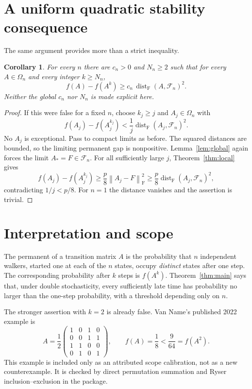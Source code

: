 \documentclass[11pt]{article}
\newtheorem{corollary}[theorem]{Corollary}
\theoremstyle{remark}\newtheorem{remark}[theorem]{Remark}
\DeclareMathOperator{\dist}{dist}
\newcommand{\Om}{\Omega_n}
\newcommand{\Fset}{\mathcal F_n}
\newcommand{\fn}[1]{\left\|#1\right\|_{\mathrm F}}
\begin{document}
\section{A uniform quadratic stability consequence}
The same argument provides more than a strict inequality.
\begin{corollary}\label{cor:stability}
For every $n$ there are $c_n>0$ and $N_n\ge2$ such that for every
$A\in\Om$ and every integer $k\ge N_n$,
\begin{equation}\label{eq:globalstability}
 f(A)-f(A^k)\ge c_n\,\dist_{\mathrm F}(A,\Fset)^2.
\end{equation}
Neither the global $c_n$ nor $N_n$ is made explicit here.
\end{corollary}
\begin{proof}
If this were false for a fixed $n$, choose $k_j\ge j$ and $A_j\in\Om$
with
\[
 f(A_j)-f(A_j^{k_j})<\frac1j\dist_{\mathrm F}(A_j,\Fset)^2.
\]
No $A_j$ is exceptional. Pass to compact limits as before. The squared
distances are bounded, so the limiting permanent gap is nonpositive.
Lemma~\ref{lem:global} again forces the limit $A_*=F\in\Fset$.
For all sufficiently large $j$, Theorem~\ref{thm:local} gives
\[
 f(A_j)-f(A_j^{k_j})
 \ge\frac p8\fn{A_j-F}^2
 \ge\frac p8\dist_{\mathrm F}(A_j,\Fset)^2,
\]
contradicting $1/j<p/8$. For $n=1$ the distance vanishes and the
assertion is trivial.
\end{proof}

\section{Interpretation and scope}
The permanent of a transition matrix $A$ is the probability that $n$
independent walkers, started one at each of the $n$ states, occupy
\emph{distinct} states after one step. The corresponding probability
after $k$ steps is $f(A^k)$. Theorem~\ref{thm:main} says that, under
double stochasticity, every sufficiently late time has probability no
larger than the one-step probability, with a threshold depending only
on $n$.

The stronger assertion with $k=2$ is already false. Van Name's published
2022 example \cite{MO} is
\[
 A=\frac12\begin{pmatrix}
 1&0&1&0\\0&0&1&1\\1&1&0&0\\0&1&0&1
 \end{pmatrix},\qquad
 f(A)=\frac18<\frac9{64}=f(A^2).
\]
This example is included only as an attributed scope calibration, not
as a new counterexample. It is checked by direct permutation summation
and Ryser inclusion--exclusion in the package.
\end{document}
